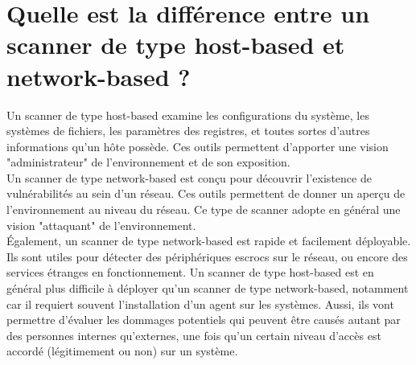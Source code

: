 \section{Quelle est la différence entre un scanner de type host-based et network-based ?}
Un scanner de type host-based examine les configurations du système, les systèmes de fichiers, les paramètres des registres, et toutes sortes d'autres informations qu'un hôte possède. Ces outils permettent d'apporter une vision "administrateur" de l'environnement et de son exposition. \\

Un scanner de type network-based est conçu pour découvrir l'existence de vulnérabilités au sein d'un réseau. Ces outils permettent de donner un aperçu de l'environnement au niveau du réseau. Ce type de scanner adopte en général une vision "attaquant" de l'environnement. \\

\'Egalement, un scanner de type network-based est rapide et facilement déployable. Ils sont utiles pour détecter des périphériques escrocs sur le réseau, ou encore des services étranges en fonctionnement. Un scanner de type host-based est en général plus difficile à déployer qu'un scanner de type network-based, notamment car il requiert souvent l'installation d'un agent sur les systèmes. Aussi, ils vont permettre d'évaluer les dommages potentiels qui peuvent être causés autant par des personnes internes qu'externes, une fois qu'un certain niveau d'accès est accordé (légitimement ou non) sur un système.

